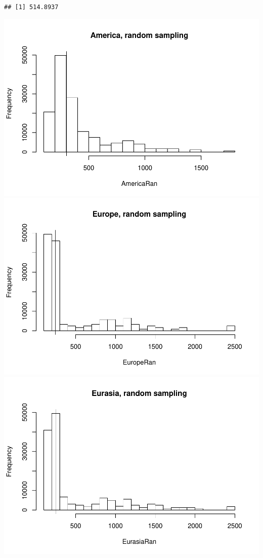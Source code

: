 \documentclass[]{article}
\begin{document}
\begin{verbatim}
## [1] 514.8937
\end{verbatim}

\includegraphics{MA_JJ_files/figure-latex/RSCon-1.pdf}
\includegraphics{MA_JJ_files/figure-latex/RSCon-2.pdf}
\includegraphics{MA_JJ_files/figure-latex/RSCon-3.pdf}
\end{document}
